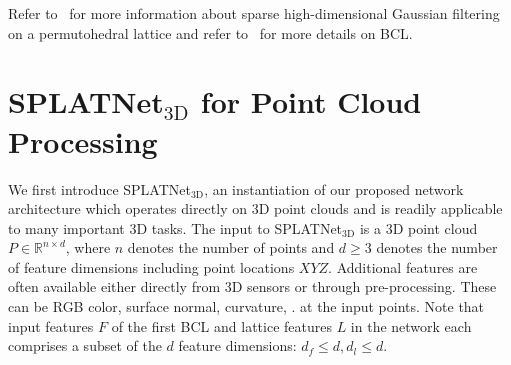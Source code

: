 \documentclass[10pt,twocolumn,letterpaper]{article}
\begin{document}
Refer to~\cite{adams2010fast} for more information about sparse high-dimensional Gaussian filtering
on a permutohedral lattice and refer to~\cite{jampani2016learning} for more details on BCL.


\section{SPLATNet$_{\text{3D}}$ for Point Cloud Processing}\label{sec:bpcn_3d}We first introduce SPLATNet$_{\text{3D}}$, an instantiation of our proposed network architecture which operates directly on 3D point clouds and is readily applicable to many important 3D tasks. 
The input to SPLATNet$_{\text{3D}}$ is a 3D point cloud $P \in \mathbb{R}^{n \times d}$, where $n$ denotes the number of points and $d \ge 3$ denotes the number of feature dimensions including point locations $XYZ$. 
Additional features are often available either directly from 3D sensors 
or through pre-processing. These can be RGB color, surface normal, curvature, \etc. at the input points.
Note that input features $F$ of the first BCL and lattice features $L$ in the network each 
comprises a subset of the $d$ feature dimensions: $d_f\le d, d_l \le d$.
\end{document}
